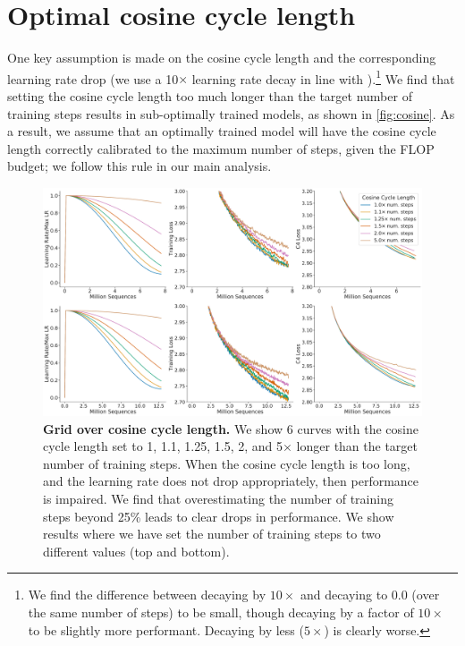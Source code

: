 \documentclass[11pt, a4paper, logo, copyright, nonumbering]{deepmind}
\begin{document}
\section{Optimal cosine cycle length}
\label{sec:cosine_cycle}
One key assumption is made on the cosine cycle length and the corresponding learning rate drop (we use a 10$\times$ learning rate decay in line with \citet{rae2021gopher}).\footnote{We find the difference between decaying by $10\times$ and decaying to 0.0 (over the same number of steps) to be small, though decaying by a factor of $10\times$ to be slightly more performant. Decaying by less ($5 \times$) is clearly worse.} 
We find that setting the cosine cycle length too much longer than the target number of training steps results in sub-optimally trained models, as shown in \autoref{fig:cosine}.
As a result, we assume that an optimally trained model will have the cosine cycle length correctly calibrated to the maximum number of steps, given the FLOP budget; we follow this rule in our main analysis.
\begin{figure}[h!]
    \centering
    \includegraphics[width=.9\textwidth]{figures/cosine_v2.pdf}
    \caption{\textbf{Grid over cosine cycle length.} We show 6 curves with the cosine cycle length set to 1, 1.1, 1.25, 1.5, 2, and 5$\times$ longer than the target number of training steps.
    When the cosine cycle length is too long, and the learning rate does not drop appropriately, then performance is impaired. 
    We find that overestimating the number of training steps beyond 25\% leads to clear drops in performance.
    We show results where we have set the number of training steps to two different values (top and bottom).
    }
    \label{fig:cosine}
\end{figure}
\end{document}
